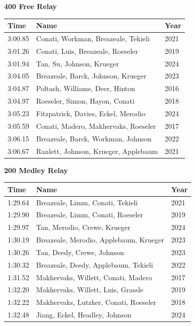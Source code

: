 \vspace{1.2em}
\noindent\begin{minipage}[t]{0.98\textwidth}
\centering
\textbf{\textcolor{teamprimary}{400 Free Relay}}\par
\vspace{0.5em}
\centering
\small
\renewcommand{\arraystretch}{1.0}
\setlength{\tabcolsep}{4pt}
\begin{tabular}{@{}p{4.5cm}p{8.5cm}p{2.5cm}@{}}
\toprule
\textbf{Time} & \textbf{Name} & \textbf{Year} \\
\midrule
3:00.85 & Conati, Workman, Breazeale, Tekieli & 2021 \\
3:01.26 & Conati, Luis, Breazeale, Roeseler & 2019 \\
3:01.94 & Tan, Su, Johnson, Krueger & 2024 \\
3:04.05 & Breazeale, Barck, Johnson, Krueger & 2023 \\
3:04.87 & Poltash, Williams, Deer, Hinton & 2016 \\
3:04.97 & Roeseler, Simon, Hayon, Conati & 2018 \\
3:05.23 & Fitzpatrick, Davies, Eckel, Merodio & 2024 \\
3:05.59 & Conati, Madero, Makhervaks, Roeseler & 2017 \\
3:06.15 & Breazeale, Barck, Workman, Johnson & 2022 \\
3:06.67 & Ranlett, Johnson, Krueger, Applebaum & 2021 \\
\bottomrule
\end{tabular}
\end{minipage}
\vspace{1.2em}
\noindent\begin{minipage}[t]{0.98\textwidth}
\centering
\textbf{\textcolor{teamprimary}{200 Medley Relay}}\par
\vspace{0.5em}
\centering
\small
\renewcommand{\arraystretch}{1.0}
\setlength{\tabcolsep}{4pt}
\begin{tabular}{@{}p{4.5cm}p{8.5cm}p{2.5cm}@{}}
\toprule
\textbf{Time} & \textbf{Name} & \textbf{Year} \\
\midrule
1:29.64 & Breazeale, Limm, Conati, Tekieli & 2021 \\
1:29.90 & Breazeale, Limm, Conati, Roeseler & 2019 \\
1:29.97 & Tan, Merodio, Crewe, Krueger & 2024 \\
1:30.19 & Breazeale, Merodio, Applebaum, Krueger & 2023 \\
1:30.26 & Tan, Deedy, Crewe, Johnson & 2023 \\
1:30.32 & Breazeale, Deedy, Applebaum, Tekieli & 2022 \\
1:31.52 & Makhervaks, Willett, Conati, Madero & 2017 \\
1:32.20 & Makhervaks, Willett, Luis, Grassle & 2019 \\
1:32.22 & Makhervaks, Lutzker, Conati, Roeseler & 2018 \\
1:32.48 & Jiang, Eckel, Headley, Johnson & 2024 \\
\bottomrule
\end{tabular}
\end{minipage}

